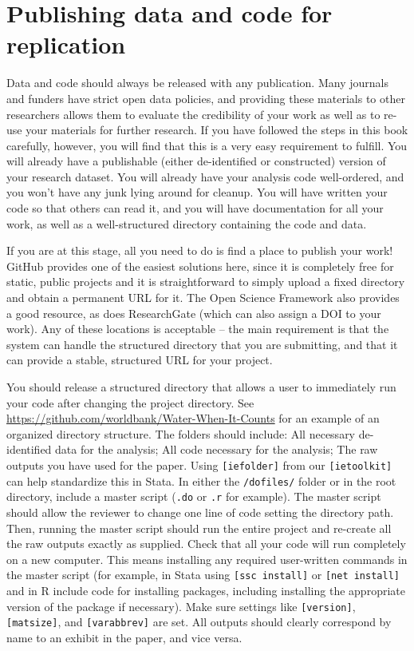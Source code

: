 
\section{Publishing data and code for replication}

Data and code should always be released with any publication.
Many journals and funders have strict open data policies,
and providing these materials to other researchers
allows them to evaluate the credibility of your work
as well as to re-use your materials for further research.
If you have followed the steps in this book carefully, however,
you will find that this is a very easy requirement to fulfill.
You will already have a publishable (either de-identified or constructed)
version of your research dataset.
You will already have your analysis code well-ordered,
and you won't have any junk lying around for cleanup.
You will have written your code so that others can read it,
and you will have documentation for all your work,
as well as a well-structured directory containing the code and data.

If you are at this stage,
all you need to do is find a place to publish your work!
GitHub provides one of the easiest solutions here,
since it is completely free for static, public projects
and it is straightforward to simply upload a fixed directory
and obtain a permanent URL for it.
The Open Science Framework also provides a good resource,
as does ResearchGate (which can also assign a DOI to your work).
Any of these locations is acceptable --
the main requirement is that the system can handle
the structured directory that you are submitting,
and that it can provide a stable, structured URL for your project.

You should release a structured directory that allows a user
to immediately run your code after changing the project directory.
See \url{https://github.com/worldbank/Water-When-It-Counts}
for an example of an organized directory structure. The folders should include:
All necessary de-identified data for the analysis;
All code necessary for the analysis;
The raw outputs you have used for the paper.
Using \texttt{[iefolder]} from our \texttt{[ietoolkit]} can help standardize this in Stata.
In either the \texttt{/dofiles/} folder or in the root directory,
include a master script (\texttt{.do} or \texttt{.r} for example).
The master script should allow the reviewer to change
one line of code setting the directory path.
Then, running the master script should run the entire project
and re-create all the raw outputs exactly as supplied.
Check that all your code will run completely on a new computer.
This means installing any required user-written commands in the master script
(for example, in Stata using \texttt{[ssc install]} or \texttt{[net install]}
and in R include code for installing packages,
including installing the appropriate version of the package if necessary).
Make sure settings like \texttt{[version]}, \texttt{[matsize]}, and \texttt{[varabbrev]} are set.
All outputs should clearly correspond by name to an exhibit in the paper, and vice versa.

